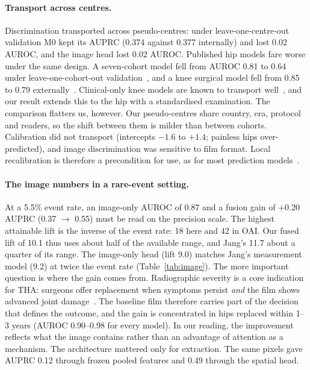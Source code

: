 \paragraph{Transport across centres.}
Discrimination transported across pseudo-centres: under leave-one-centre-out validation M0 kept its AUPRC (0.374 against
0.377 internally) and lost 0.02 AUROC, and the image head lost 0.02 AUROC. Published hip models fare worse under the
same design. A seven-cohort model fell from AUROC 0.81 to 0.64 under leave-one-cohort-out validation~\cite{vandenberg2026},
and a knee surgical model fell from 0.85 to 0.79 externally~\cite{musbahi2026}. Clinical-only knee models are known to
transport well~\cite{castagno2025}, and our result extends this to the hip with a standardised examination. The
comparison flatters us, however. Our pseudo-centres share country, era, protocol and readers, so the shift between them
is milder than between cohorts. Calibration did not transport (intercepts $-1.6$ to $+1.4$; painless hips
over-predicted), and image discrimination was sensitive to film format. Local recalibration is therefore a precondition
for use, as for most prediction models~\cite{steyerberg2016validation}.

\paragraph{The image numbers in a rare-event setting.}
At a 5.5\% event rate, an image-only AUROC of 0.87 and a fusion gain of $+0.20$ AUPRC (0.37 $\to$ 0.55) must be read on
the precision scale. The highest attainable lift is the inverse of the event rate: 18 here and 42 in OAI. Our fused lift
of 10.1 thus uses about half of the available range, and Jang's 11.7 about a quarter of its range. The image-only head
(lift 9.0) matches Jang's measurement model (9.2) at twice the event rate (Table~\ref{tab:image}). The more
important question is where the gain comes from. Radiographic severity is a core indication for THA: surgeons offer
replacement when symptoms persist \emph{and} the film shows advanced joint damage~\cite{gademan2016indication}. The
baseline film therefore carries part of the decision that defines the outcome, and the gain is concentrated in hips
replaced within 1--3 years (AUROC 0.90--0.98 for every model). In our reading, the improvement reflects what the image
contains rather than an advantage of attention as a mechanism. The architecture mattered only for extraction. The same
pixels gave AUPRC 0.12 through frozen pooled features and 0.49 through the spatial head.

